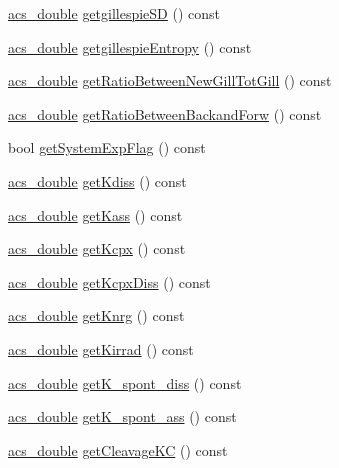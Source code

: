\begin{DoxyCompactItemize}
\hyperlink{a00024_ab776853a005fcbf56af0424a2a4dd607}{acs\-\_\-double} \hyperlink{a00011_a41d9f79794b74845f2d00b4c0affea02}{getgillespie\-S\-D} () const 
\item 
\hyperlink{a00024_ab776853a005fcbf56af0424a2a4dd607}{acs\-\_\-double} \hyperlink{a00011_af4cba1a1f9c1c0106241ca5338b7906d}{getgillespie\-Entropy} () const 
\item 
\hyperlink{a00024_ab776853a005fcbf56af0424a2a4dd607}{acs\-\_\-double} \hyperlink{a00011_a98a4989029d77e99cf2ca9fb0eb1c2ab}{get\-Ratio\-Between\-New\-Gill\-Tot\-Gill} () const 
\item 
\hyperlink{a00024_ab776853a005fcbf56af0424a2a4dd607}{acs\-\_\-double} \hyperlink{a00011_aa0e7940868932ac4b26fd61943952528}{get\-Ratio\-Between\-Backand\-Forw} () const 
\item 
bool \hyperlink{a00011_a883327bbb969164eb8b3c2d1c941ca03}{get\-System\-Exp\-Flag} () const 
\item 
\hyperlink{a00024_ab776853a005fcbf56af0424a2a4dd607}{acs\-\_\-double} \hyperlink{a00011_ab429d2057ee1092bf210c29e70153f75}{get\-Kdiss} () const 
\item 
\hyperlink{a00024_ab776853a005fcbf56af0424a2a4dd607}{acs\-\_\-double} \hyperlink{a00011_aa862f1f98c6060747d6f1f30377671ff}{get\-Kass} () const 
\item 
\hyperlink{a00024_ab776853a005fcbf56af0424a2a4dd607}{acs\-\_\-double} \hyperlink{a00011_ac62c6b719db59d5829e3cc451b237f44}{get\-Kcpx} () const 
\item 
\hyperlink{a00024_ab776853a005fcbf56af0424a2a4dd607}{acs\-\_\-double} \hyperlink{a00011_a9091c4a0fe31f6d5f5330e7ebff297a3}{get\-Kcpx\-Diss} () const 
\item 
\hyperlink{a00024_ab776853a005fcbf56af0424a2a4dd607}{acs\-\_\-double} \hyperlink{a00011_a7615c746521a592ff1ab2d0793b14d89}{get\-Knrg} () const 
\item 
\hyperlink{a00024_ab776853a005fcbf56af0424a2a4dd607}{acs\-\_\-double} \hyperlink{a00011_a4c163b36e84cd8406aff4ab5d220a251}{get\-Kirrad} () const 
\item 
\hyperlink{a00024_ab776853a005fcbf56af0424a2a4dd607}{acs\-\_\-double} \hyperlink{a00011_a2c6ca24592b5feab891e43233c581711}{get\-K\-\_\-spont\-\_\-diss} () const 
\item 
\hyperlink{a00024_ab776853a005fcbf56af0424a2a4dd607}{acs\-\_\-double} \hyperlink{a00011_a6557765370b636bc7d4e02288b444c0e}{get\-K\-\_\-spont\-\_\-ass} () const 
\item 
\hyperlink{a00024_ab776853a005fcbf56af0424a2a4dd607}{acs\-\_\-double} \hyperlink{a00011_a771963196a27d3532cd7af4b98a5a9c5}{get\-Cleavage\-K\-C} () const 

\end{DoxyCompactItemize}
